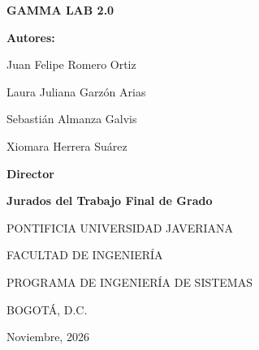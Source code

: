 \documentclass[12pt,letterpaper,oneside]{article}
\DeclareRobustCommand{\_}{\textunderscore\allowbreak}
\newcommand{\tituloProyecto}{GAMMA LAB 2.0}
\newcommand{\autorUno}{Juan Felipe Romero Ortiz}
\newcommand{\autorDos}{Laura Juliana Garzón Arias}
\newcommand{\autorTres}{Sebastián Almanza Galvis}
\newcommand{\autorCuatro}{Xiomara Herrera Suárez}
\newcommand{\universidad}{PONTIFICIA UNIVERSIDAD JAVERIANA}
\newcommand{\facultad}{FACULTAD DE INGENIERÍA}
\newcommand{\programa}{PROGRAMA DE INGENIERÍA DE SISTEMAS}
\newcommand{\ciudad}{BOGOTÁ, D.C.}
\newcommand{\fechaLarga}{Noviembre, 2026}
\begin{document}

\begin{center}
  {\Large\bfseries \tituloProyecto}\par
  \vspace{1.4cm}

  {\bfseries Autores:}\par
  \vspace{0.5cm}
  \autorUno\par
  \autorDos\par
  \autorTres\par
  \autorCuatro\par
  \vspace{1.4cm}

  \leyendaGrado\par
  \vspace{1.4cm}

  {\bfseries Director}\par
  \vspace{0.4cm}
  \director\par
  \vspace{1.2cm}

  {\bfseries Jurados del Trabajo Final de Grado}\par
  \vspace{0.4cm}
  \juradoUno\par
  \juradoDos\par
  \vspace{1.8cm}

  \universidad\par\vspace{0.6cm}
  \facultad\par\vspace{0.6cm}
  \programa\par\vspace{0.6cm}
  \ciudad\par\vspace{0.6cm}
  \fechaLarga\par
\end{center}
\clearpage
\end{document}
